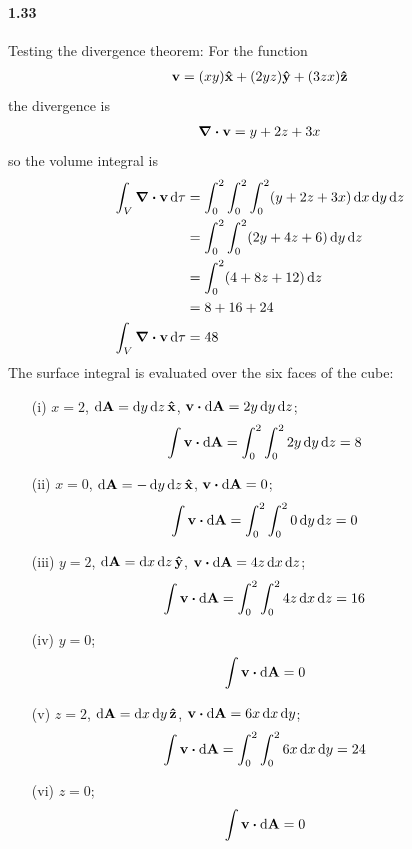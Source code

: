 \documentclass[../main.tex]{subfiles}
\begin{document}
\newpage
\paragraph{1.33}
Testing the divergence theorem: For the function
\begin{align*}
    \vb{v} = (xy) \vu{x} + (2yz) \vu{y} + (3zx)\vu{z}
\end{align*}
the divergence is
\begin{align*}
    \div{\vb{v}} = y + 2z + 3x
\end{align*}
so the volume integral is
\begin{align*}
    \int_V \div{\vb{v}} \dd{\tau} &= \int_0^2 \int_0^2 \int_0^2(y + 2z + 3x) \dd{x}\dd{y}\dd{z} \\
    &= \int_0^2 \int_0^2 (2y + 4z + 6) \dd{y}\dd{z} \\
    &= \int_0^2 (4 + 8z + 12) \dd{z} \\
    &= 8 + 16 + 24 \\
    \int_V \div{\vb v} \dd{\tau} &= 48
\end{align*}
The surface integral is evaluated over the six faces of the cube:
\begin{enumerate}
    \item [(i)] $x = 2$, $\dd{\vb{A}} = \dd{y}\dd{z} \vu{x}$, $\vb{v} \vdot \dd{\vb{A}} = 2y \dd{y}\dd{z}$;
    \begin{align*}
        \int \vb{v} \vdot \dd{\vb{A}} &= \int_0^2 \int_0^2 2y \dd{y}\dd{z} = 8
    \end{align*}
    \item [(ii)] $x = 0$, $\dd{\vb{A}} = -\dd{y}\dd{z} \vu{x}$, $\vb{v} \vdot \dd{\vb{A}} = 0$;
    \begin{align*}
        \int \vb{v} \vdot \dd{\vb{A}} &= \int_0^2 \int_0^2 0 \dd{y}\dd{z} = 0
    \end{align*}
    \item [(iii)] $y = 2$, $\dd{\vb{A}} = \dd{x}\dd{z} \vu{y}$, $\vb{v} \vdot \dd{\vb{A}} = 4z \dd{x}\dd{z}$;
    \begin{align*}
        \int \vb{v} \vdot \dd{\vb{A}} &= \int_0^2 \int_0^2 4z \dd{x}\dd{z} = 16
    \end{align*}
    \item [(iv)] $y = 0$;
    \begin{align*}
        \int \vb{v} \vdot \dd{\vb{A}} &= 0
    \end{align*}
    \item [(v)] $z = 2$, $\dd{\vb{A}} = \dd{x}\dd{y} \vu{z}$, $\vb{v} \vdot \dd{\vb{A}} = 6x \dd{x}\dd{y}$;
    \begin{align*}
        \int \vb{v} \vdot \dd{\vb{A}} &= \int_0^2 \int_0^2 6x \dd{x}\dd{y} = 24
    \end{align*}
    \item [(vi)] $z = 0$;
    \begin{align*}
        \int \vb{v} \vdot \dd{\vb{A}} &= 0
    \end{align*}
\end{enumerate}
\end{document}
